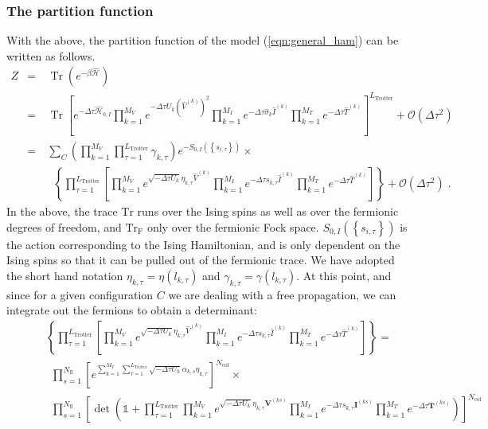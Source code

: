 \documentclass{SciPost}
\def\Tr{\mathop{\mathrm{Tr}}}
\def\Trf{\mathop{\mathrm{Tr}_{\mathrm{F}}}}
\begin{document}
\subsubsection{The partition function}\label{sec:part}
%
With the above, the partition function of the model (\ref{eqn:general_ham}) can be written as follows.
\begin{eqnarray}\label{eqn:partition_1}
Z &=& \Tr{\left(e^{-\beta \hat{\mathcal{H}} }\right)}\nonumber\\
  &=&   \Tr{  \left[ e^{-\Delta \tau \hat{\mathcal{H}}_{0,I}}   
    \prod_{k=1}^{M_V}   e^{ - \Delta \tau  U_k \left(  \hat{V}^{(k)} \right)^2}   \prod_{k=1}^{M_I}   e^{  -\Delta \tau  \hat{\sigma}_{k}  \hat{I}^{(k)}} 
    \prod_{k=1}^{M_T}   e^{-\Delta \tau \hat{T}^{(k)}}  
   \right]^{L_{\text{Trotter}}}}  + \mathcal{O}(\Delta\tau^{2})\nonumber \\
   &=&
   \sum_{C} \left( \prod_{k=1}^{M_V} \prod_{\tau=1}^{L_{\mathrm{Trotter}}} \gamma_{k,\tau} \right) e^{-S_{0,I} \left( \left\{ s_{i,\tau} \right\}  \right) }\times \nonumber\\
   &\quad&
    \Trf{ \left\{  \prod_{\tau=1}^{L_{\mathrm{Trotter}}} \left[   
    \prod_{k=1}^{M_V}   e^{  \sqrt{ -\Delta \tau  U_k} \eta_{k,\tau} \hat{V}^{(k)} }   \prod_{k=1}^{M_I}   e^{  -\Delta \tau s_{k,\tau}  \hat{I}^{(k)}} 
    \prod_{k=1}^{M_T}   e^{-\Delta \tau \hat{T}^{(k)}}    \right]\right\} }+ \mathcal{O}(\Delta\tau^{2})\;.
\end{eqnarray}
In the above,  the trace $\mathrm{Tr} $  runs over the Ising spins as well as over the fermionic degrees of freedom, and $ \mathrm{Tr}_{\mathrm{F}}  $ only over the  fermionic Fock space. 
$S_{0,I} \left( \left\{ s_{i,\tau} \right\}  \right)  $ is the action  corresponding to the Ising Hamiltonian,  and is only dependent on the Ising spins so that  it can be pulled out of the fermionic trace.  We have adopted the short hand notation $\eta_{k,\tau}  = \eta(l_{k,\tau})$   and $\gamma_{k,\tau}  = \gamma(l_{k,\tau})$.
At this point,  and  since for a given configuration $C$  we are dealing with a free propagation, we can integrate out the fermions to obtain a determinant: 
\begin{eqnarray}
 &\quad&\Trf{ \left\{  \prod_{\tau=1}^{L_{\mathrm{Trotter}}} \left[   
    \prod_{k=1}^{M_V}   e^{  \sqrt{ - \Delta \tau  U_k} \eta_{k,\tau} \hat{V}^{(k)} }   \prod_{k=1}^{M_I}   e^{  -\Delta \tau s_{k,\tau}  \hat{I}^{(k)}}  
    \prod_{k=1}^{M_T}   e^{-\Delta \tau \hat{T}^{(k)}}   \right] \right\}} = \nonumber\\
&\quad& \quad\prod\limits_{s=1}^{N_{\mathrm{fl}}} \left[  e^{\sum\limits_{k=1}^{M_V} \sum\limits_{\tau = 1}^{L_{\mathrm{Trotter}}}\sqrt{-\Delta \tau U_k}  \alpha_{k,s} \eta_{k,\tau} }
   \right]^{N_{\mathrm{col}}}\times
\nonumber\\
&\quad&\quad   \prod\limits_{s=1}^{N_{\mathrm{fl}}} 
   \left[
    \det\left(  \mathds{1} + 
     \prod_{\tau=1}^{L_{\mathrm{Trotter}}}  
    \prod_{k=1}^{M_V}   e^{  \sqrt{ -\Delta \tau  U_k} \eta_{k,\tau} {\bm V}^{(ks)} }   \prod_{k=1}^{M_I}   e^{  -\Delta \tau s_{k,\tau}  {\bm I}^{(ks)}}   \prod_{k=1}^{M_T}   e^{-\Delta \tau \textbf{T}^{(ks)}}  
     \right) \right]^{N_{\mathrm{col}}}
\end{eqnarray}
\end{document}
